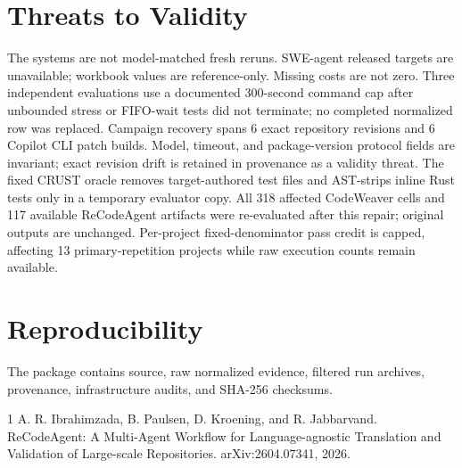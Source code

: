 \documentclass[10pt,twocolumn]{article}
\begin{document}
\section{Threats to Validity}
The systems are not model-matched fresh reruns. SWE-agent released targets are
unavailable; workbook values are reference-only. Missing costs are not zero.
Three independent evaluations use a documented 300-second command cap after
unbounded stress or FIFO-wait tests did not terminate; no completed normalized
row was replaced. Campaign recovery spans 6 exact repository revisions and 6 Copilot CLI patch builds. Model, timeout, and package-version protocol fields are invariant; exact revision drift is retained in provenance as a validity threat.
The fixed CRUST oracle removes target-authored test files and AST-strips inline Rust tests only in a temporary evaluator copy. All 318 affected CodeWeaver cells and 117 available ReCodeAgent artifacts were re-evaluated after this repair; original outputs are unchanged. Per-project fixed-denominator pass credit is capped, affecting 13 primary-repetition projects while raw execution counts remain available.
\section{Reproducibility}
The package contains source, raw normalized evidence, filtered run archives,
provenance, infrastructure audits, and SHA-256 checksums.
\begin{thebibliography}{1}
 A. R. Ibrahimzada, B. Paulsen, D. Kroening, and
R. Jabbarvand. ReCodeAgent: A Multi-Agent Workflow for Language-agnostic
Translation and Validation of Large-scale Repositories. arXiv:2604.07341, 2026.
\end{thebibliography}
\end{document}
